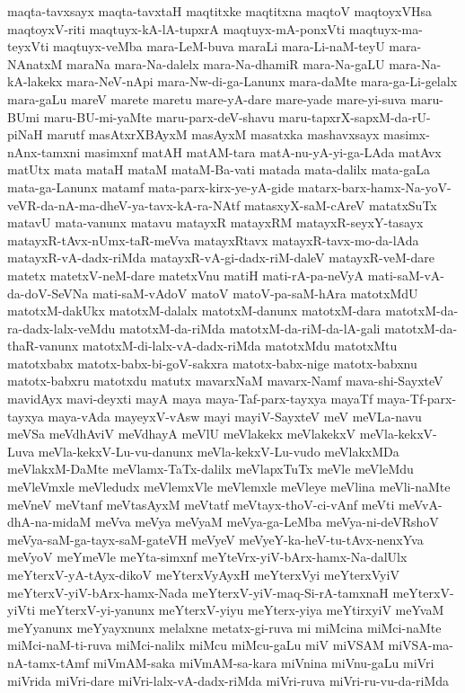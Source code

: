 {maqta-tavxsayx
maqta-tavxtaH
maqtitxke
maqtitxna
maqtoV
maqtoyxVHsa
maqtoyxV-riti
maqtuyx-kA-lA-tupxrA
maqtuyx-mA-ponxVti
maqtuyx-ma-teyxVti
maqtuyx-veMba
mara-LeM-buva
maraLi
mara-Li-naM-teyU
mara-NAnatxM
maraNa
mara-Na-dalelx
mara-Na-dhamiR
mara-Na-gaLU
mara-Na-kA-lakekx
mara-NeV-nApi
mara-Nw-di-ga-Lanunx
mara-daMte
mara-ga-Li-gelalx
mara-gaLu
mareV
marete
maretu
mare-yA-dare
mare-yade
mare-yi-suva
maru-BUmi
maru-BU-mi-yaMte
maru-parx-deV-shavu
maru-tapxrX-sapxM-da-rU-piNaH
marutf
masAtxrXBAyxM
masAyxM
masatxka
mashavxsayx
masimx-nAnx-tamxni
masimxnf
matAH
matAM-tara
matA-nu-yA-yi-ga-LAda
matAvx
matUtx
mata
mataH
mataM
mataM-Ba-vati
matada
mata-dalilx
mata-gaLa
mata-ga-Lanunx
matamf
mata-parx-kirx-ye-yA-gide
matarx-barx-hamx-Na-yoV-veVR-da-nA-ma-dheV-ya-tavx-kA-ra-NAtf
matasxyX-saM-cAreV
matatxSuTx
matavU
mata-vanunx
matavu
matayxR
matayxRM
matayxR-seyxY-tasayx
matayxR-tAvx-nUmx-taR-meVva
matayxRtavx
matayxR-tavx-mo-da-lAda
matayxR-vA-dadx-riMda
matayxR-vA-gi-dadx-riM-daleV
matayxR-veM-dare
matetx
matetxV-neM-dare
matetxVnu
matiH
mati-rA-pa-neVyA
mati-saM-vA-da-doV-SeVNa
mati-saM-vAdoV
matoV
matoV-pa-saM-hAra
matotxMdU
matotxM-dakUkx
matotxM-dalalx
matotxM-danunx
matotxM-dara
matotxM-da-ra-dadx-lalx-veMdu
matotxM-da-riMda
matotxM-da-riM-da-lA-gali
matotxM-da-thaR-vanunx
matotxM-di-lalx-vA-dadx-riMda
matotxMdu
matotxMtu
matotxbabx
matotx-babx-bi-goV-sakxra
matotx-babx-nige
matotx-babxnu
matotx-babxru
matotxdu
matutx
mavarxNaM
mavarx-Namf
mava-shi-SayxteV
mavidAyx
mavi-deyxti
mayA
maya
maya-Taf-parx-tayxya
mayaTf
maya-Tf-parx-tayxya
maya-vAda
mayeyxV-vAsw
mayi
mayiV-SayxteV
meV
meVLa-navu
meVSa
meVdhAviV
meVdhayA
meVlU
meVlakekx
meVlakekxV
meVla-kekxV-Luva
meVla-kekxV-Lu-vu-danunx
meVla-kekxV-Lu-vudo
meVlakxMDa
meVlakxM-DaMte
meVlamx-TaTx-dalilx
meVlapxTuTx
meVle
meVleMdu
meVleVmxle
meVledudx
meVlemxVle
meVlemxle
meVleye
meVlina
meVli-naMte
meVneV
meVtanf
meVtasAyxM
meVtatf
meVtayx-thoV-ci-vAnf
meVti
meVvA-dhA-na-midaM
meVva
meVya
meVyaM
meVya-ga-LeMba
meVya-ni-deVRshoV
meVya-saM-ga-tayx-saM-gateVH
meVyeV
meVyeY-ka-heV-tu-tAvx-nenxYva
meVyoV
meYmeVle
meYta-simxnf
meYteVrx-yiV-bArx-hamx-Na-dalUlx
meYterxV-yA-tAyx-dikoV
meYterxVyAyxH
meYterxVyi
meYterxVyiV
meYterxV-yiV-bArx-hamx-Nada
meYterxV-yiV-maq-Si-rA-tamxnaH
meYterxV-yiVti
meYterxV-yi-yanunx
meYterxV-yiyu
meYterx-yiya
meYtirxyiV
meYvaM
meYyanunx
meYyayxnunx
melalxne
metatx-gi-ruva
mi
miMcina
miMci-naMte
miMci-naM-ti-ruva
miMci-nalilx
miMcu
miMcu-gaLu
miV
miVSAM
miVSA-ma-nA-tamx-tAmf
miVmAM-saka
miVmAM-sa-kara
miVnina
miVnu-gaLu
miVri
miVrida
miVri-dare
miVri-lalx-vA-dadx-riMda
miVri-ruva
miVri-ru-vu-da-riMda
}
